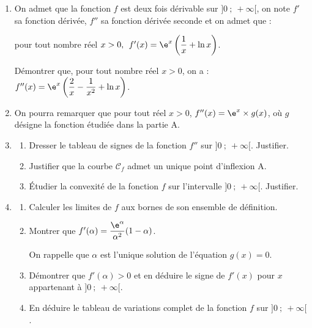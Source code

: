 \begin{enumerate}
\item On admet que la fonction $f$ est deux fois dérivable sur $]0~;~+\infty[$, on note $f'$ sa fonction dérivée, $f''$ sa fonction dérivée seconde et on admet que :

pour tout nombre réel $x > 0,\:\: f'(x) = \e^x \left(\dfrac 1x + \ln x\right)$.

Démontrer que, pour tout nombre réel $x > 0$, on a : $f''(x) = \e^x \left(\dfrac 2x - \dfrac{1}{x^2} + \ln x\right)$.
\item On pourra remarquer que pour tout réel $x > 0$,\: $f''(x) = \e^x \times  g(x)$, où $g$ désigne la fonction étudiée dans la partie A.
\item 
	\begin{enumerate}
		\item Dresser le tableau de signes de la fonction $f''$ sur $]0~;~+\infty[$. Justifier.
		\item Justifier que la courbe $\mathcal{C}_f$ admet un unique point d'inflexion A.
		\item Étudier la convexité de la fonction $f$ sur l'intervalle $]0~;~+\infty[$. Justifier.
	\end{enumerate}
\item
	\begin{enumerate}
		\item Calculer les limites de $f$ aux bornes de son ensemble de définition.
		\item Montrer que $f'(\alpha) = \dfrac{\e^{\alpha}}{\alpha^2}(1 - \alpha)$.

On rappelle que $\alpha$ est l'unique solution de l'équation $g(x) = 0$.
		\item Démontrer que $f'(\alpha) > 0$ et en déduire le signe de $f'(x)$ pour $x$ appartenant à $]0~;~+\infty[$.
		\item En déduire le tableau de variations complet de la fonction $f$ sur $]0~;~+\infty[$.
	\end{enumerate}
\end{enumerate}
